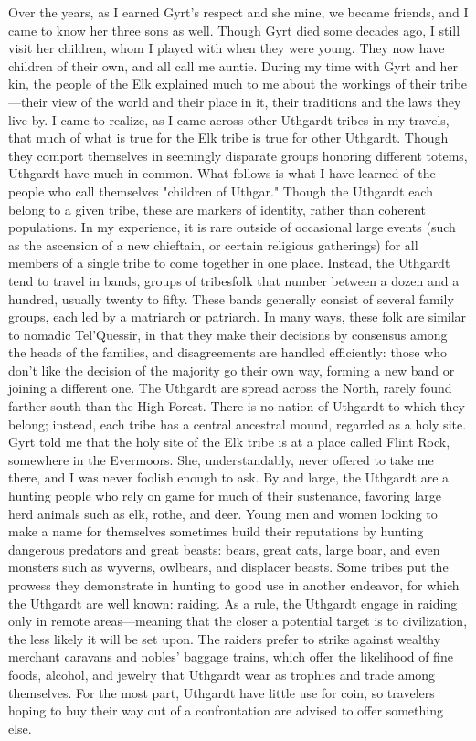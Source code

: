 \documentclass[10pt,a4paper,twoside,twocolumn,openany,bg=print,nodeprecatedcode]{dndbook}
\begin{document}
Over the years, as I earned Gyrt's respect and she mine, we became friends, and I came to know her three sons as well. Though Gyrt died some decades ago, I still visit her children, whom I played with when they were young. They now have children of their own, and all call me auntie.
During my time with Gyrt and her kin, the people of the Elk explained much to me about the workings of their tribe—their view of the world and their place in it, their traditions and the laws they live by. I came to realize, as I came across other Uthgardt tribes in my travels, that much of what is true for the Elk tribe is true for other Uthgardt. Though they comport themselves in seemingly disparate groups honoring different totems, Uthgardt have much in common. What follows is what I have learned of the people who call themselves "children of Uthgar."
Though the Uthgardt each belong to a given tribe, these are markers of identity, rather than coherent populations. In my experience, it is rare outside of occasional large events (such as the ascension of a new chieftain, or certain religious gatherings) for all members of a single tribe to come together in one place. Instead, the Uthgardt tend to travel in bands, groups of tribesfolk that number between a dozen and a hundred, usually twenty to fifty. These bands generally consist of several family groups, each led by a matriarch or patriarch. In many ways, these folk are similar to nomadic Tel'Quessir, in that they make their decisions by consensus among the heads of the families, and disagreements are handled efficiently: those who don't like the decision of the majority go their own way, forming a new band or joining a different one.
The Uthgardt are spread across the North, rarely found farther south than the High Forest. There is no nation of Uthgardt to which they belong; instead, each tribe has a central ancestral mound, regarded as a holy site. Gyrt told me that the holy site of the Elk tribe is at a place called Flint Rock, somewhere in the Evermoors. She, understandably, never offered to take me there, and I was never foolish enough to ask.
By and large, the Uthgardt are a hunting people who rely on game for much of their sustenance, favoring large herd animals such as elk, rothe, and deer. Young men and women looking to make a name for themselves sometimes build their reputations by hunting dangerous predators and great beasts: bears, great cats, large boar, and even monsters such as wyverns, owlbears, and displacer beasts.
Some tribes put the prowess they demonstrate in hunting to good use in another endeavor, for which the Uthgardt are well known: raiding. As a rule, the Uthgardt engage in raiding only in remote areas—meaning that the closer a potential target is to civilization, the less likely it will be set upon. The raiders prefer to strike against wealthy merchant caravans and nobles' baggage trains, which offer the likelihood of fine foods, alcohol, and jewelry that Uthgardt wear as trophies and trade among themselves. For the most part, Uthgardt have little use for coin, so travelers hoping to buy their way out of a confrontation are advised to offer something else.
\end{document}
